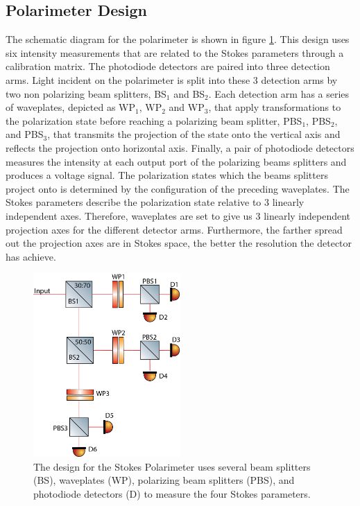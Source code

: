 \documentclass{article}
\begin{document}
\subsection{Polarimeter Design}
The schematic diagram for the polarimeter is shown in figure \ref{Polarimeter Schematic}. This design uses six intensity measurements that are related to the Stokes parameters through a calibration matrix. The photodiode detectors are paired into three detection arms. Light incident on the polarimeter is split into these 3 detection arms by two non polarizing beam splitters, BS$_1$ and BS$_2$. Each detection arm has a series of waveplates, depicted as WP$_1$, WP$_2$ and WP$_3$, that apply transformations to the polarization state before reaching a polarizing beam splitter, PBS$_1$, PBS$_2$, and PBS$_3$, that transmits the projection of the state onto the vertical axis and reflects the projection onto horizontal axis. Finally, a pair of photodiode detectors measures the intensity at each output port of the polarizing beams splitters and produces a voltage signal. The polarization states which the beams splitters project onto is determined by the configuration of the preceding waveplates. The Stokes parameters describe the polarization state relative to 3 linearly independent axes. Therefore, waveplates are set to give us 3 linearly independent projection axes for the different detector arms. Furthermore, the farther spread out the projection axes are in Stokes space, the better the resolution the detector has achieve. 
\begin{figure}[!h]
\begin{center}
\includegraphics[width=0.5\textwidth]{refs_figures/PolarimeterSchematic.png}
\end{center}
\caption{The design for the Stokes Polarimeter uses several beam splitters (BS), waveplates (WP), polarizing beam splitters (PBS), and photodiode detectors (D) to measure the four Stokes parameters.}
\label{Polarimeter Schematic}
\end{figure}
\end{document}
